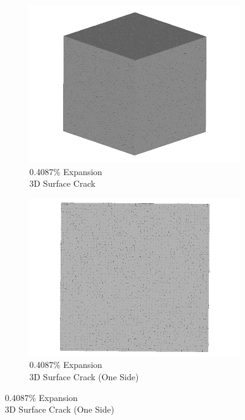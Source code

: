 \begin{figure}[ht!]
    \begin{subfigure}{.5\textwidth}
      \centering
      \includegraphics[width=0.5\linewidth]{Files/exp_3D/DEF/A30X-1C_2_3d.png}
      \caption{0.4087\% Expansion\\3D Surface Crack}
    \end{subfigure}%
    \begin{subfigure}{.5\textwidth}
      \centering
      \includegraphics[width=0.5\linewidth]{Files/exp_3D/DEF/A30X-1C_2_3ds.png}
      \caption{0.4087\% Expansion\\3D Surface Crack (One Side)}
    \end{subfigure}%


\end{figure}
